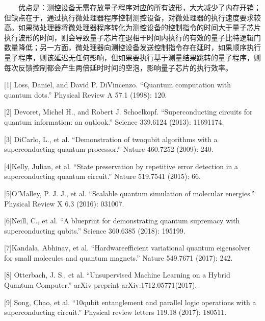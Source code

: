 \documentclass[a4paper,11pt,english]{sphinxmanual}
\begin{document}
\sphinxAtStartPar
{}

\sphinxAtStartPar
  优点是：测控设备无需存放量子程序对应的所有波形，大大减少了内存开销；但缺点在于，通过执行微处理器程序控制测控设备，对微处理器的执行速度要求较高。如果微处理器将微处理器程序转化为测控设备的控制指令的时间大于量子芯片执行波形的时间，则会导致量子芯片在退相干时间内执行的有效的量子比特逻辑门数量降低；另一方面，微处理器向测控设备发送控制指令存在延时，如果顺序执行量子程序，则该延迟无任何影响，但如果要执行基于测量结果跳转的量子程序，则每次反馈控制都会产生两倍延时时间的空泡，影响量子芯片的执行效率。

\sphinxAtStartPar
{}

\sphinxAtStartPar
{[}1{]} Loss, Daniel, and David P. DiVincenzo. “Quantum computation with quantum dots.” Physical Review A 57.1 (1998): 120.

\sphinxAtStartPar
{[}2{]} Devoret, Michel H., and Robert J. Schoelkopf. “Superconducting circuits for quantum information: an outlook.” Science 339.6124 (2013): 1169\sphinxhyphen{}1174.

\sphinxAtStartPar
{[}3{]} DiCarlo, L., et al. “Demonstration of two\sphinxhyphen{}qubit algorithms with a superconducting quantum processor.” Nature 460.7252 (2009): 240.

\sphinxAtStartPar
{[}4{]}Kelly, Julian, et al. “State preservation by repetitive error detection in a superconducting quantum circuit.” Nature 519.7541 (2015): 66.

\sphinxAtStartPar
{[}5{]}O’Malley, P. J. J., et al. “Scalable quantum simulation of molecular energies.” Physical Review X 6.3 (2016): 031007.

\sphinxAtStartPar
{[}6{]}Neill, C., et al. “A blueprint for demonstrating quantum supremacy with superconducting qubits.” Science 360.6385 (2018): 195\sphinxhyphen{}199.

\sphinxAtStartPar
{[}7{]}Kandala, Abhinav, et al. “Hardware\sphinxhyphen{}efficient variational quantum eigensolver for small molecules and quantum magnets.” Nature 549.7671 (2017): 242.

\sphinxAtStartPar
{[}8{]} Otterbach, J. S., et al. “Unsupervised Machine Learning on a Hybrid Quantum Computer.” arXiv preprint arXiv:1712.05771(2017).

\sphinxAtStartPar
{[}9{]} Song, Chao, et al. “10\sphinxhyphen{}qubit entanglement and parallel logic operations with a superconducting circuit.” Physical review letters 119.18 (2017): 180511.
\end{document}
